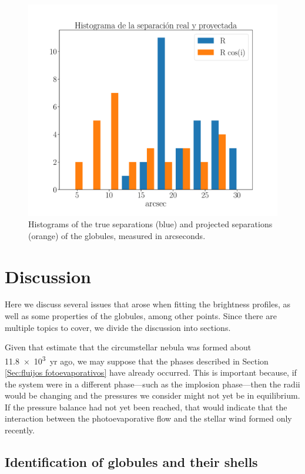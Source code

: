 \documentclass{book}
\begin{document}
\begin{figure}[htb]
    \centering
    \includegraphics[width=\textwidth]{ultimos/Hist_seprarcion(1).pdf}
    \caption{Histograms of the true separations (blue) and projected
      separations (orange) of the globules, measured in arcseconds.}
    \label{fig:hist_sep_ryp}
\end{figure}
\chapter{Discussion}\label{Chp:conclusiones}

Here we discuss several issues that arose when fitting the brightness
profiles, as well as some properties of the globules, among other
points. Since there are multiple topics to cover, we divide the
discussion into sections.

Given that \cite{Zavala:2022} estimate that the circumstellar nebula
was formed about \SI{11.8e3}{yr} ago, we may suppose that the phases
described in Section \ref{Sec:fluijos fotoevaporativos} have already
occurred. This is important because, if the system were in a different
phase—such as the implosion phase—then the radii would be changing and
the pressures we consider might not yet be in equilibrium. If the
pressure balance had not yet been reached, that would indicate that
the interaction between the photoevaporative flow and the stellar wind
formed only recently.

\section{Identification of globules and their shells}\label{dis:casaras}
\end{document}
